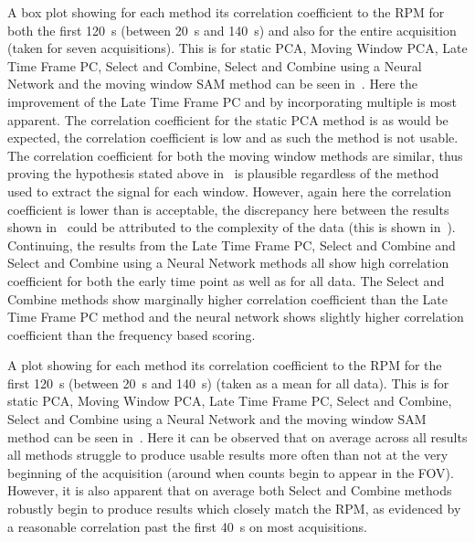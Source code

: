     A box plot showing for each method its correlation coefficient to the \gls{RPM} for both the first \SI{120}{\second} (between \SI{20}{\second} and \SI{140}{\second}) and also for the entire acquisition (taken for seven acquisitions). This is for static \gls{PCA}, Moving Window \gls{PCA}, Late Time Frame \gls{PC}, Select and Combine, Select and Combine using a Neural Network and the moving window \gls{SAM} method can be seen in~. Here the improvement of the Late Time Frame \gls{PC} and by incorporating multiple  is most apparent. The correlation coefficient for the static \gls{PCA} method is as would be expected, the correlation coefficient is low and as such the method is not usable. The correlation coefficient for both the moving window methods are similar, thus proving the hypothesis stated above in~ is plausible regardless of the method used to extract the signal for each window. However, again here the correlation coefficient is lower than is acceptable, the discrepancy here between the results shown in~\cite{Schleyer2014} could be attributed to the complexity of the data (this is shown in~). Continuing, the results from the Late Time Frame \gls{PC}, Select and Combine and Select and Combine using a Neural Network methods all show high correlation coefficient for both the early time point as well as for all data. The Select and Combine methods show marginally higher correlation coefficient than the Late Time Frame \gls{PC} method and the neural network shows slightly higher correlation coefficient than the frequency based scoring.
    
    A plot showing for each method its correlation coefficient to the \gls{RPM} for the first \SI{120}{\second} (between \SI{20}{\second} and \SI{140}{\second}) (taken as a mean for all data). This is for static \gls{PCA}, Moving Window \gls{PCA}, Late Time Frame \gls{PC}, Select and Combine, Select and Combine using a Neural Network and the moving window \gls{SAM} method can be seen in~. Here it can be observed that on average across all results all methods struggle to produce usable results more often than not at the very beginning of the acquisition (around when counts begin to appear in the \gls{FOV}). However, it is also apparent that on average both Select and Combine methods robustly begin to produce results which closely match the \gls{RPM}, as evidenced by a reasonable correlation past the first \SI{40}{\second} on most acquisitions.
    
